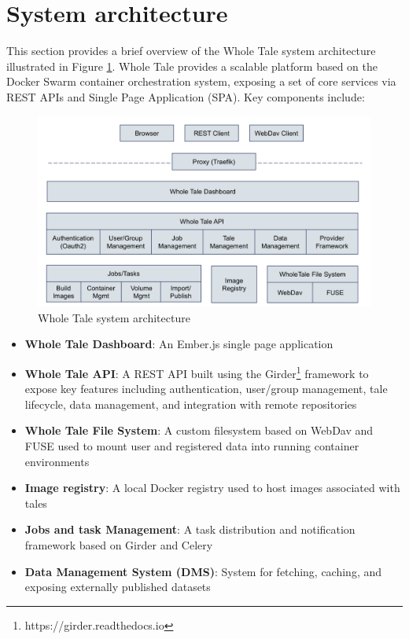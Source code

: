 \documentclass[conference]{IEEEtran}
\begin{document}
\section{System architecture} \label{architecture}

This section provides a brief overview of the Whole Tale system architecture illustrated in Figure 
\ref{architecture}. Whole Tale 
provides a scalable platform based on the Docker Swarm container orchestration system, exposing a 
set of core services via REST APIs and Single Page Application (SPA). Key components include:

\begin{figure}
\centering
\includegraphics[scale=0.25]{images/wholetale-architecture.png}
\caption{Whole Tale system architecture}
\end{figure}
\label{architecture}

\begin{itemize}
\item{{\bf Whole Tale Dashboard}: An Ember.js single page application}
\item{{\bf Whole Tale API}: A REST API built using the Girder\footnote{https://girder.readthedocs.io} framework to expose key features including authentication, user/group management, tale lifecycle, data management, and integration with remote repositories}
\item{{\bf Whole Tale File System}: A custom filesystem based on WebDav and FUSE used to mount user and registered data into running container environments}
\item{{\bf Image registry}: A local Docker registry used to host images associated with tales}
\item{{\bf Jobs and task Management}: A task distribution and notification framework based on Girder and Celery}
\item{{\bf Data Management System (DMS)}: System for fetching, caching, and exposing externally published datasets}
\end{itemize}
\end{document}
